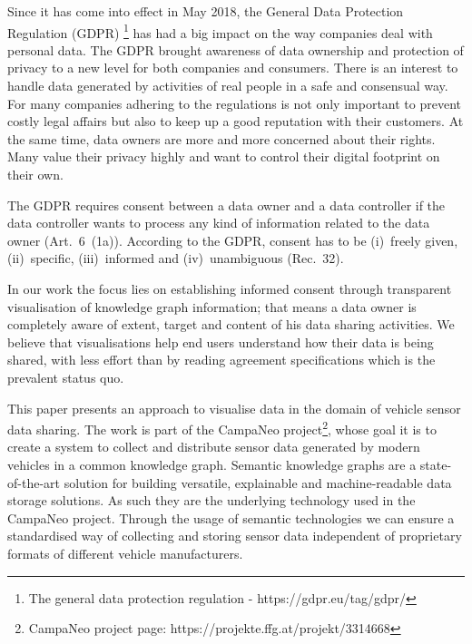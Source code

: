 \documentclass[../paper.tex]{subfiles}
\begin{document}
  Since it has come into effect in May 2018, the General Data Protection
  Regulation (GDPR) \footnote{The general data protection
  regulation - https://gdpr.eu/tag/gdpr/} has had a big impact on the way companies deal with
  personal data. The GDPR brought awareness of data ownership and protection
  of privacy to a new level for both companies and consumers. There is an
  interest to handle data generated by activities of real people in a safe and
  consensual way. For many companies adhering to the regulations is not only
  important to prevent costly legal affairs but also to keep up a good
  reputation with their customers. At the same time, data owners are more and
  more concerned about their rights. Many value their privacy highly and want
  to control their digital footprint on their own.

  The GDPR requires consent between a data owner and a data controller
  if the data controller wants to process any kind of information related to
  the data owner (Art.~6~(1a)). According to the GDPR, consent has to be
  (i)~freely given, (ii)~specific, (iii)~informed and (iv)~unambiguous (Rec.~32).

  In our work the focus lies on establishing informed consent through transparent visualisation of 
  knowledge graph information; that means a data owner
  is completely aware of extent, target and content of his data sharing
  activities. We believe that
  visualisations help end users understand how their data is being shared,
  with less effort than by reading agreement specifications which is the prevalent
  status quo.


  This paper presents an approach to visualise data in the domain of vehicle
  sensor data sharing. The work is part of the CampaNeo project\footnote{CampaNeo project page: https://projekte.ffg.at/projekt/3314668}, whose goal
  it is to create a system to collect and distribute sensor data generated by
  modern vehicles in a common knowledge graph.
  Semantic knowledge graphs are a state-of-the-art solution for building
  versatile, explainable and machine-readable data storage solutions.
  As such they are the underlying technology used in the CampaNeo project.
  Through the usage of semantic technologies we can ensure a standardised way of collecting 
  and storing sensor data independent of proprietary formats of different vehicle manufacturers.
  
\end{document}
